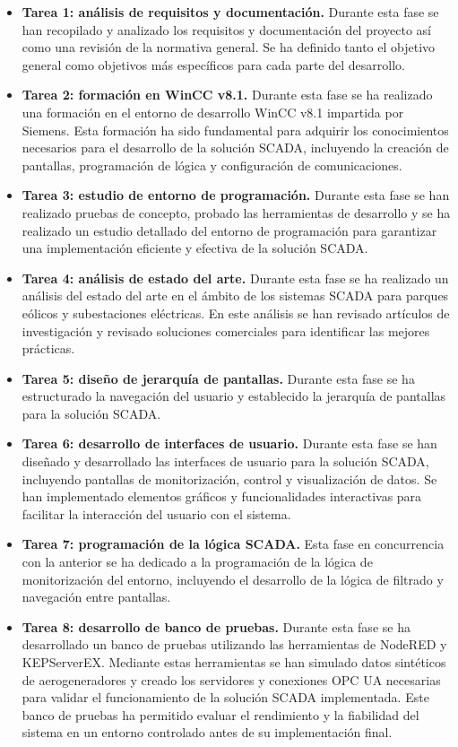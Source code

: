 \begin{itemize}
    \item \textbf{Tarea 1: análisis de requisitos y documentación.} Durante esta fase se han recopilado y analizado los requisitos y documentación del proyecto así como una revisión de la normativa general. Se ha definido tanto el objetivo general como objetivos más específicos para cada parte del desarrollo.
    
    \item \textbf{Tarea 2: formación en WinCC v8.1.} Durante esta fase se ha realizado una formación en el entorno de desarrollo WinCC v8.1 impartida por Siemens. Esta formación ha sido fundamental para adquirir los conocimientos necesarios para el desarrollo de la solución \ac{SCADA}, incluyendo la creación de pantallas, programación de lógica y configuración de comunicaciones.
    \item \textbf{Tarea 3: estudio de entorno de programación.} Durante esta fase se han realizado pruebas de concepto, probado las herramientas de desarrollo y se ha realizado un estudio detallado del entorno de programación para garantizar una implementación eficiente y efectiva de la solución \ac{SCADA}.
    \item \textbf{Tarea 4: análisis de estado del arte.} Durante esta fase se ha realizado un análisis del estado del arte en el ámbito de los sistemas \ac{SCADA} para parques eólicos y subestaciones eléctricas. En este análisis se han revisado artículos de investigación y revisado soluciones comerciales para identificar las mejores prácticas.
    \item \textbf{Tarea 5: diseño de jerarquía de pantallas.} Durante esta fase se ha estructurado la navegación del usuario y establecido la jerarquía de pantallas para la solución \ac{SCADA}. 
    \item \textbf{Tarea 6: desarrollo de interfaces de usuario.} Durante esta fase se han diseñado y desarrollado las interfaces de usuario para la solución \ac{SCADA}, incluyendo pantallas de monitorización, control y visualización de datos. Se han implementado elementos gráficos y funcionalidades interactivas para facilitar la interacción del usuario con el sistema. 
    \item \textbf{Tarea 7: programación de la lógica SCADA.} Esta fase en concurrencia con la anterior se ha dedicado a la programación de la lógica de monitorización del entorno, incluyendo el desarrollo de la lógica de filtrado y navegación entre pantallas.
    \item \textbf{Tarea 8: desarrollo de banco de pruebas.} Durante esta fase se ha desarrollado un banco de pruebas utilizando las herramientas de NodeRED y KEPServerEX. Mediante estas herramientas se han simulado datos sintéticos de aerogeneradores y creado los servidores y conexiones \ac{OPC UA} necesarias para validar el funcionamiento de la solución \ac{SCADA} implementada. Este banco de pruebas ha permitido evaluar el rendimiento y la fiabilidad del sistema en un entorno controlado antes de su implementación final.

\end{itemize}
